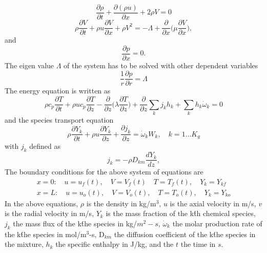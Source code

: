 \begin{equation}
\frac{\partial \rho}{\partial t} + \frac{\partial (\rho u)}{\partial x} + 2\rho V = 0
\end{equation}
\begin{equation}
 \rho \frac{\partial V}{\partial t} + \rho u \frac{\partial V}{\partial x} + \rho V^2 = -\Lambda + \frac{\partial }{\partial x}\bigg(\mu \frac{\partial V}{\partial x} \bigg),
\end{equation}
and
\begin{equation}
 \frac{\partial p}{\partial x} = 0.
\end{equation}
The eigen value $\Lambda$ of the system has to be solved with other dependent variables
\begin{equation}
 \frac{1}{r}\frac{\partial p}{\partial r} = \Lambda
\end{equation}
The energy equation is written as
\begin{equation}
 \rho c_p \frac{\partial T}{\partial t}+ \rho u c_p \frac{\partial T}{\partial z} - \frac{\partial }{\partial z}\bigg(\lambda \frac{\partial T}{\partial z} \bigg) + \frac{\partial}{\partial z} \sum_k j_k h_{k}  + \sum_k h_k\dot{\omega}_k = 0
\label{energy}
\end{equation}
and the species transport equation
\begin{equation}
 \rho \frac{\partial Y_k}{\partial t}+ \rho u \frac{\partial Y_k}{\partial z} + \frac{\partial j_k}{\partial z} = \dot{\omega}_k W_k, \quad k=1\ldots K_g
\label{species}
\end{equation}
with $j_k$ defined as
\begin{equation}
 j_k = -\rho D_{km} \frac{dY_k}{dz},
\end{equation}
The boundary conditions for the above system of equations are 
\begin{eqnarray}
 x = 0: \quad u=u_f(t), \quad V = V_f(t) \quad T=T_f(t), \quad Y_k = Y_{kf} \nonumber \\
x=L: \quad u=u_o(t), \quad V=V_o(t), \quad T=T_o(t), \quad Y_k = Y_{ko}
\end{eqnarray}
In the above equations, $\rho$ is the density in kg/m$^3$, $u$ is the axial velocity in m/s, $v$ is the radial velocity in m/s,  $Y_k$ is the mass fraction of the k\'th chemical species, $j_k$ the mass flux of the k\'the species in kg/$m^2-s$, $\dot{\omega}_k$ the molar production rate of the k\'the species in mol/m$^3$-s, D$_{km}$ the diffusion coefficient of the k\'the species in the mixture, $h_k$ the specific enthalpy in J/kg, and the $t$ the time in $s$.

